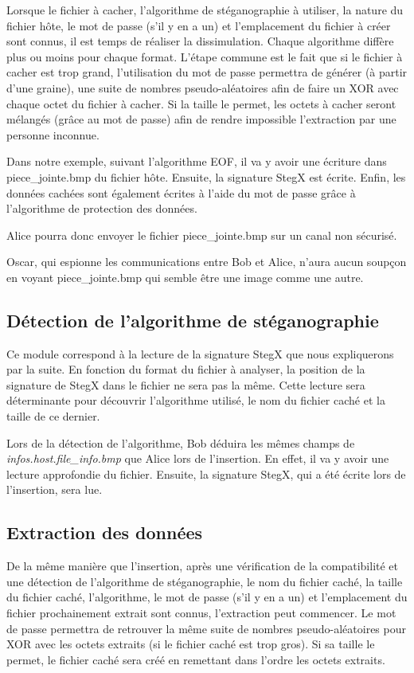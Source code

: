 \documentclass[11pt]{article}
\begin{document}
Lorsque le fichier à cacher, l'algorithme de stéganographie à utiliser, 
la nature du fichier hôte, le mot de passe (s'il y en a un) et l'emplacement 
du fichier à créer sont connus, il est temps de réaliser la dissimulation. 
Chaque algorithme diffère plus ou moins pour chaque format. 
L'étape commune est le fait que si le fichier à cacher est trop grand, 
l'utilisation du mot de passe permettra de générer (à partir d'une graine), 
une suite de nombres pseudo-aléatoires afin de faire un XOR avec chaque 
octet du fichier à cacher. Si la taille le permet, les octets à cacher 
seront mélangés (grâce au mot de passe) afin de rendre impossible l'extraction 
par une personne inconnue. 

Dans notre exemple, suivant l'algorithme EOF, il va y avoir une écriture 
dans piece\_jointe.bmp du fichier hôte. 
Ensuite, la signature StegX est écrite. 
Enfin, les données cachées sont également écrites à l'aide du mot de passe
grâce à l'algorithme de protection des données. 

Alice pourra donc envoyer le fichier piece\_jointe.bmp sur un canal non 
sécurisé. 

Oscar, qui espionne les communications entre Bob et Alice, n'aura aucun 
soupçon en voyant piece\_jointe.bmp qui semble être une image comme une 
autre. 

\subsection{Détection de l'algorithme de stéganographie}

Ce module correspond à la lecture de la signature StegX que nous expliquerons 
par la suite. En fonction du format
du fichier à analyser, la position de la signature de StegX dans le fichier ne
sera pas la même. Cette lecture sera déterminante pour découvrir l'algorithme
utilisé, le nom du fichier caché et la taille de ce dernier. 

Lors de la détection de l'algorithme, Bob déduira les mêmes champs de 
\textit{infos.host.file\_info.bmp} que Alice lors de l'insertion. En effet, 
il va y avoir une lecture approfondie du fichier. Ensuite, la signature 
StegX, qui a été écrite lors de l'insertion, sera lue.

\subsection{Extraction des données}

De la même manière que l'insertion, 
après une vérification de la compatibilité et une détection de l'algorithme 
de stéganographie, le nom du fichier caché, la taille du fichier caché, 
l'algorithme, le mot de passe (s'il y en a un) et l'emplacement du fichier 
prochainement extrait sont connus, l'extraction peut commencer. 
Le mot de passe permettra de retrouver la même suite de nombres pseudo-aléatoires 
pour XOR avec les octets extraits (si le fichier caché est trop gros). 
Si sa taille le permet, le fichier caché sera créé en remettant dans l'ordre 
les octets extraits. 
\end{document}
